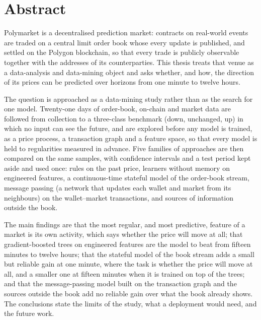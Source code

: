\chapter*{Abstract}

Polymarket is a decentralised prediction market: contracts on real-world events are
traded on a central limit order book whose every update is published, and settled on the
Polygon blockchain, so that every trade is publicly observable together with the addresses
of its counterparties.  This thesis treats that
venue as a data-analysis and data-mining object and asks whether, and how, the direction
of its prices can be predicted over horizons from one minute to twelve hours.

The question is approached as a data-mining study rather than as the search for one
model.  Twenty-one days of order-book, on-chain and market data are followed from
collection to a three-class benchmark (down, unchanged, up) in which no input can see the
future, and are explored
before any model is trained, as a price process, a transaction graph and a feature space,
so that every model is held to regularities measured in advance.  Five families of
approaches are then compared on the same samples, with confidence intervals and a test
period kept aside and used once: rules on the past price, learners without memory on
engineered features, a continuous-time stateful model of the order-book stream, message
passing (a network that updates each wallet and market from its neighbours) on the
wallet--market transactions, and sources of information outside the book.

The main findings are that the most regular, and most predictive, feature of a market is
its own activity, which says whether the price will move at all; that
gradient-boosted trees on engineered features are the model to beat from fifteen minutes
to twelve hours; that the stateful model of the book stream adds a small but reliable gain
at one minute, where the task is whether the price will move at all, and a smaller one at
fifteen minutes when it is trained on top of the trees; and that the
message-passing model built on the transaction graph and the sources outside the book add
no reliable gain over what the book already shows.  The conclusions state the limits of the study, what a deployment would
need, and the future work.
